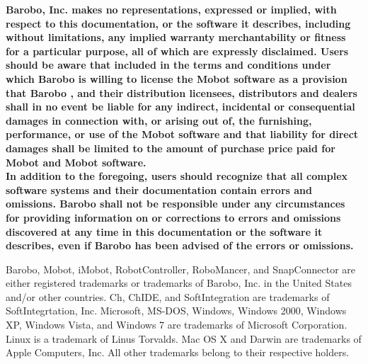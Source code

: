 \noindent
{\bf 
Barobo, Inc.
makes no representations, expressed or implied, with respect
to this documentation, or the software
it describes, including without limitations, any implied
warranty merchantability or fitness for a particular
purpose, all of which are expressly disclaimed.
Users should be aware that included in the terms and conditions
under which  Barobo is willing to license the Mobot software
as a provision that
Barobo , and their distribution
licensees, distributors and dealers shall in no event
be liable for any indirect, incidental or consequential
damages in connection with, 
or arising out of, the furnishing, performance,
or use of the Mobot software
and that liability for direct damages shall be limited
to the amount of purchase price paid for Mobot and Mobot software.\\

\noindent
In addition to the foregoing, users should recognize
that all complex software systems and their documentation
contain errors and omissions. Barobo
shall not be responsible under any circumstances
for providing information on or corrections to errors
and omissions discovered at any time in this documentation
or the software it describes,
even if Barobo has
been advised of the errors or omissions.\\
}


\noindent
Barobo, Mobot, iMobot, RobotController, RoboMancer, and SnapConnector
are either
registered trademarks or trademarks of Barobo, Inc.
in the United States and/or other countries.
Ch, ChIDE, and  SoftIntegration 
are trademarks of SoftIntegrtation, Inc.
Microsoft, MS-DOS, Windows, Windows 2000, Windows XP, 
Windows Vista, and Windows 7
are trademarks of Microsoft Corporation.
Linux is a trademark of Linus Torvalds.
Mac OS X and Darwin are trademarks of Apple Computers, Inc.
All other trademarks belong to their respective holders.
